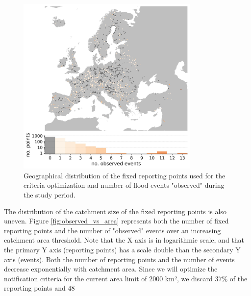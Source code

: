 \documentclass[preprint,12pt]{elsarticle}
\begin{document}
\begin{figure}
    \centering
    \includegraphics[width=0.8\textwidth]{figures/map_observed_events_2000km2_1239points.jpg}
    \caption{Geographical distribution of the fixed reporting points used for the criteria optimization and number of flood events "observed" during the study period.}
    \label{fig:map_observed}
\end{figure}

The distribution of the catchment size of the fixed reporting points is also uneven. Figure \ref{fig:observed_vs_area} represents both the number of fixed reporting points and the number of "observed" events over an increasing catchment area threshold. Note that the X axis is in logarithmic scale, and that the primary Y axis (reporting points) has a scale double than the secondary Y axis (events). Both the number of reporting points and the number of events decrease exponentially with catchment area. Since we will optimize the notification criteria for the current area limit of 2000 km², we discard 37\% of the reporting points and 48%
\end{document}
